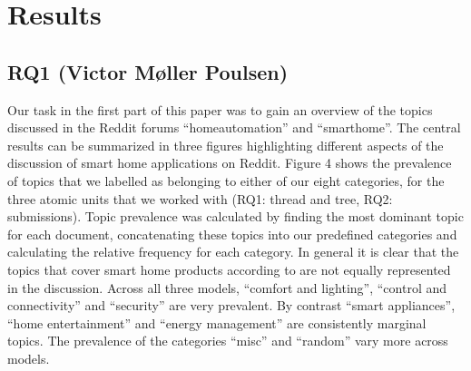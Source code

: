 \documentclass{article}
\begin{document}
    \section{Results}
    \subsection{RQ1 (Victor Møller Poulsen)}
    Our task in the first part of this paper was to gain an overview of the topics discussed in the Reddit forums “homeautomation” and “smarthome”. The central results can be summarized in three figures highlighting different aspects of the discussion of smart home applications on Reddit. Figure 4 shows the prevalence of topics that we labelled as belonging to either of our eight categories, for the three atomic units that we worked with (RQ1: thread and tree, RQ2: submissions). Topic prevalence was calculated by finding the most dominant topic for each document, concatenating these topics into our predefined categories and calculating the relative frequency for each category. In general it is clear that the topics that cover smart home products according to  are not equally represented in the discussion. Across all three models, “comfort and lighting”, “control and connectivity” and “security” are very prevalent. By contrast “smart appliances”, “home entertainment” and “energy management” are consistently marginal topics. The prevalence of the categories “misc” and “random” vary more across models. 
    
\end{document}
